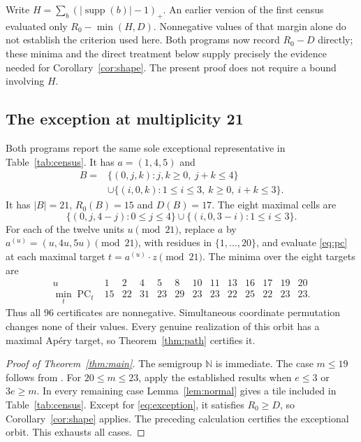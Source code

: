 \documentclass[11pt]{article}
\theoremstyle{definition}
\theoremstyle{remark}
\newcommand{\N}{\mathbb{N}}
\newcommand{\PC}{\operatorname{PC}}
\newcommand{\pos}[1]{(#1)_{+}}
\begin{document}
Write $H=\sum_b\pos{|\operatorname{supp}(b)|-1}$. An earlier version of
the first census evaluated only $R_0-\min(H,D)$. Nonnegative values of that margin alone do not establish the criterion
used here. Both programs now record $R_0-D$ directly; these minima and
the direct treatment below supply precisely the evidence needed for
Corollary~\ref{cor:shape}. The present proof does not require a bound
involving $H$.

\subsection{The exception at multiplicity 21}

Both programs report the same sole exceptional representative in
Table~\ref{tab:census}. It has $a=(1,4,5)$ and
\begin{equation}\label{eq:exception}
\begin{split}
B={}&\{(0,j,k):j,k\ge0,\ j+k\le4\}\\
 &\cup\{(i,0,k):1\le i\le3,\ k\ge0,\ i+k\le3\}.
\end{split}
\end{equation}
It has $|B|=21$, $R_0(B)=15$ and $D(B)=17$. The eight maximal cells are
\[
\{(0,j,4-j):0\le j\le4\}\cup\{(i,0,3-i):1\le i\le3\}.
\]
For each of the twelve units $u\pmod{21}$, replace $a$ by
$a^{(u)}=(u,4u,5u)\pmod{21}$, with residues in $\{1,\ldots,20\}$,
and evaluate \eqref{eq:pc} at each maximal target
$t=a^{(u)}\cdot z\pmod{21}$. The minima over the eight targets are
\[
\begin{array}{c|rrrrrrrrrrrr}
u&1&2&4&5&8&10&11&13&16&17&19&20\\ \hline
\min_t\PC_t&15&22&31&23&29&23&23&22&25&22&23&23.
\end{array}
\]
Thus all $96$ certificates are nonnegative. Simultaneous coordinate
permutation changes none of their values. Every genuine realization of
this orbit has a maximal Ap\'ery target, so Theorem~\ref{thm:path}
certifies it.

\begin{proof}[Proof of Theorem~\ref{thm:main}]
The semigroup $\N$ is immediate.
The case $m\le19$ follows from \cite{BGOW,KS}. For $20\le m\le23$,
apply the established results when $e\le3$ or $3e\ge m$.
In every remaining case Lemma~\ref{lem:normal} gives a tile included in
Table~\ref{tab:census}. Except for \eqref{eq:exception}, it satisfies
$R_0\ge D$, so Corollary~\ref{cor:shape} applies. The preceding
calculation certifies the exceptional orbit. This exhausts all cases.
\end{proof}
\end{document}
